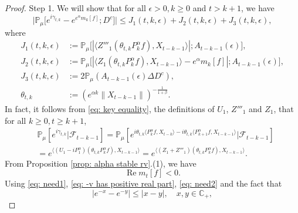 \documentclass[12pt,a4paper]{amsart}
\theoremstyle{plain}
\theoremstyle{definition}
\numberwithin{equation}{section}
\begin{document}
\begin{proof}
    Step 1. We will show that for all $\epsilon > 0, k\geq 0$ and $t>k+1$, we have
\begin{equation}
    \big|\mathbb{P}_{\mu}\big[e^{i\gamma_{t,k}}-e^{e^{\alpha}m_k[f]}; D^c\big]\big|
    \leq J_1(t,k,\epsilon)+J_2(t,k,\epsilon)+J_3(t,k,\epsilon),
\end{equation}
    where
\begin{align}
\label{eq: Def of Ji}
    J_1(t,k,\epsilon)
    &:= \mathbb{P}_{\mu}\big[|\langle Z'''_1(\theta_{t,k}P^\alpha_k f), X_{t-k-1}\rangle|; A_{t-k-1}(\epsilon) \big],
    \\ J_2(t,k,\epsilon)
    &:= \mathbb{P}_{\mu}\big[|\langle Z_1(\theta_{t,k}P^\alpha_k f),X_{t-k-1}\rangle-e^{\alpha}m_k[f]|; A_{t-k-1}(\epsilon)\big],
    \\ J_3(t,k, \epsilon)
    &:=2\mathbb{P}_{\mu}(A_{t-k-1}(\epsilon)\Delta D^c),
    \\\theta_{t,k}
    &:= (e^{\alpha k}\|X_{t-k-1}\|)^{-\frac{1}{1+\beta}}.
\end{align}
    In fact, it follows from \eqref{eq: key equality}, the definitions of $U_1$, $Z'''_1$ and $Z_1$, that for all $k\geq 0, t\geq k+1$,
\begin{align}
\label{eq: need1}
    &\mathbb{P}_{\mu}[e^{i\gamma_{t,k}}|\mathscr{F}_{t-k-1}]
    =\mathbb{P}_{\mu}[e^{i\theta_{t,k}\langle P^\alpha_k f,X_{t-k}\rangle-i\theta_{t,k}\langle P^\alpha_{k+1} f, X_{t-k-1}\rangle}|\mathscr{F}_{t-k-1}]
    \\&=e^{\langle (U_1 - iP^\alpha_1 ) (\theta_{t,k}P^\alpha_k f),X_{t-k-1}\rangle}
    =e^{\langle (Z_1 + Z'''_1) (\theta_{t,k}P^\alpha_k f),X_{t-k-1}\rangle}.
\end{align}
    From Proposition \ref{prop: alpha stable rv}.(1), we have
\begin{equation}
\label{eq: need2}
    \operatorname {Re} m_t[f] < 0.
\end{equation}
  Using \eqref{eq: need1}, \eqref{eq: -v has positive real part}, \eqref{eq: need2} and the fact that
\[
    |e^{-x} - e^{-y}| \leq |x-y|,\quad x,y \in \mathbb C_+,
\]
\end{proof}
\end{document}
